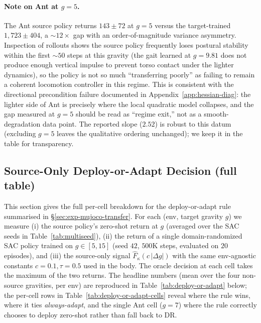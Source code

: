 \documentclass{article}
\begin{document}
\paragraph{Note on Ant at $g{=}5$.} The Ant source policy returns $143 \pm 72$ at $g{=}5$ versus the target-trained $1{,}723 \pm 404$, a ${\sim}12\times$ gap with an order-of-magnitude variance asymmetry. Inspection of rollouts shows the source policy frequently loses postural stability within the first ${\sim}50$ steps at this gravity (the gait learned at $g{=}9.81$ does not produce enough vertical impulse to prevent torso contact under the lighter dynamics), so the policy is not so much ``transferring poorly'' as failing to remain a coherent locomotion controller in this regime. This is consistent with the directional precondition failure documented in Appendix~\ref{app:hessian-diag}: the lighter side of Ant is precisely where the local quadratic model collapses, and the gap measured at $g{=}5$ should be read as ``regime exit,'' not as a smooth-degradation data point. The reported slope ($2.52$) is robust to this datum (excluding $g{=}5$ leaves the qualitative ordering unchanged); we keep it in the table for transparency.

\subsection{Source-Only Deploy-or-Adapt Decision (full table)}
\label{app:deploy-or-adapt}

This section gives the full per-cell breakdown for the deploy-or-adapt rule summarised in \S\ref{sec:exp-mujoco-transfer}. For each (env, target gravity $g$) we measure (i) the source policy's zero-shot return at $g$ (averaged over the SAC seeds in Table~\ref{tab:multiseed}), (ii) the return of a single domain-randomized SAC policy trained on $g\in[5,15]$ (seed $42$, $500$K steps, evaluated on $20$ episodes), and (iii) the source-only signal $\hat F_\kappa(c\,|\Delta g|)$ with the same env-agnostic constants $c{=}0.1, \tau{=}0.5$ used in the body. The oracle decision at each cell takes the maximum of the two returns. The headline numbers (mean over the four non-source gravities, per env) are reproduced in Table~\ref{tab:deploy-or-adapt} below; the per-cell rows in Table~\ref{tab:deploy-or-adapt-cells} reveal where the rule wins, where it ties \emph{always-adapt}, and the single Ant cell ($g{=}7$) where the rule correctly chooses to deploy zero-shot rather than fall back to DR.
\end{document}
